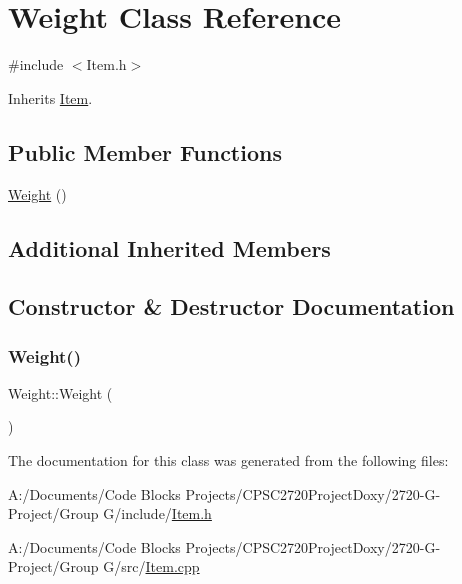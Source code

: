 \hypertarget{class_weight}{}\section{Weight Class Reference}
\label{class_weight}


{\ttfamily \#include $<$Item.\+h$>$}



Inherits \mbox{\hyperlink{class_item}{Item}}.

\subsection*{Public Member Functions}
\begin{DoxyCompactItemize}
\item 
\mbox{\hyperlink{class_weight_a28f7ba0de62e35d63c706c34732c0d9b}{Weight}} ()
\end{DoxyCompactItemize}
\subsection*{Additional Inherited Members}


\subsection{Constructor \& Destructor Documentation}
\mbox{\label{class_weight_a28f7ba0de62e35d63c706c34732c0d9b}} 
\subsubsection{\texorpdfstring{Weight()}{Weight()}}
{\footnotesize\ttfamily Weight\+::\+Weight (\begin{DoxyParamCaption}{ }\end{DoxyParamCaption})}



The documentation for this class was generated from the following files\+:\begin{DoxyCompactItemize}
\item 
A\+:/\+Documents/\+Code Blocks Projects/\+C\+P\+S\+C2720\+Project\+Doxy/2720-\/\+G-\/\+Project/\+Group G/include/\mbox{\hyperlink{_item_8h}{Item.\+h}}\item 
A\+:/\+Documents/\+Code Blocks Projects/\+C\+P\+S\+C2720\+Project\+Doxy/2720-\/\+G-\/\+Project/\+Group G/src/\mbox{\hyperlink{_item_8cpp}{Item.\+cpp}}\end{DoxyCompactItemize}
